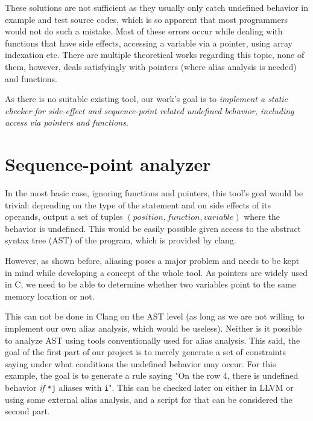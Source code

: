 These solutions are not sufficient as they usually only catch undefined behavior in example and test source codes, which is so apparent that most programmers would not do such a mistake. Most of these errors occur while dealing with functions that have side effects, accessing a variable via a pointer, using array indexation etc.
There are multiple theoretical works regarding this topic, none of them, however, deals satisfyingly with pointers (where alias analysis is needed)~\cite{aliasAnalysis} and functions.

As there is no suitable existing tool, our work's goal is to \emph{implement a static checker for side-effect and sequence-point related undefined behavior, including access via pointers and functions}.

\chapter{Sequence-point analyzer}
In the most basic case, ignoring functions and pointers, this tool's goal would be trivial: depending on the type of the statement and on side effects of its operands, output a set of tuples $(position, function, variable)$ where the behavior is undefined. This would be easily possible given access to the abstract syntax tree (AST) of the program, which is provided by clang.

However, as shown before, aliasing poses a major problem and needs to be kept in mind while developing a concept of the whole tool. As pointers are widely used in C, we need to be able to determine whether two variables point to the same memory location or not.

This can not be done in Clang on the AST level (as long as we are not willing to implement our own alias analysis, which would be useless). Neither is it possible to analyze AST using tools conventionally used for alias analysis. This said, the goal of the first part of our project is to merely generate a set of constraints saying under what conditions the undefined behavior may occur. For this example, the goal is to generate a rule saying "On the row 4, there is undefined behavior \emph{if} \verb|*j| aliases with \verb|i|". This can be checked later on either in LLVM or using some external alias analysis, and a script for that can be considered the second part.


